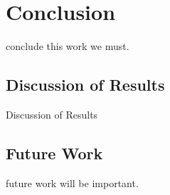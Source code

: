 \chapter{Conclusion}
conclude this work we must.
\section{Discussion of Results} \label{sec:EvalDiscussion}
Discussion of Results
\section{Future Work}
future work will be important.
